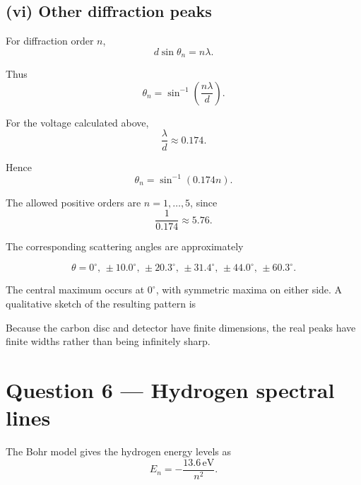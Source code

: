 \documentclass[11pt,a4paper]{article}
\begin{document}
\subsection{(vi) Other diffraction peaks}

For diffraction order $n$,
\[
d\sin\theta_n=n\lambda.
\]

Thus
\[
\boxed{
\theta_n=\sin^{-1}\left(\frac{n\lambda}{d}\right)
}.
\]

For the voltage calculated above,
\[
\frac{\lambda}{d}\approx0.174.
\]

Hence
\[
\theta_n=\sin^{-1}(0.174n).
\]

The allowed positive orders are $n=1,\ldots,5$, since
\[
\frac{1}{0.174}\approx5.76.
\]

The corresponding scattering angles are approximately

\[
\boxed{
\theta
=
0^\circ,\,
\pm10.0^\circ,\,
\pm20.3^\circ,\,
\pm31.4^\circ,\,
\pm44.0^\circ,\,
\pm60.3^\circ
}.
\]

The central maximum occurs at $0^\circ$, with symmetric maxima on either side.
A qualitative sketch of the resulting pattern is

\begin{center}
\end{center}

Because the carbon disc and detector have finite dimensions, the real peaks have
finite widths rather than being infinitely sharp.

\section{Question 6 --- Hydrogen spectral lines}

The Bohr model gives the hydrogen energy levels as
\[
\boxed{
E_n=-\frac{13.6\,\mathrm{eV}}{n^2}
}.
\]
\end{document}
